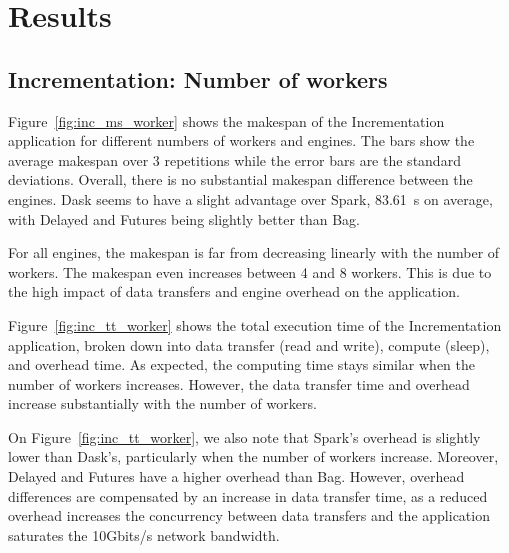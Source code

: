 \documentclass[conference]{IEEEtran}
\begin{document}
\section{Results}

\subsection{Incrementation: Number of workers}
Figure~\ref{fig:inc_ms_worker} shows the makespan of the Incrementation application
for different numbers of workers and engines. The bars show the average
makespan over 3 repetitions while the error bars are the standard deviations. Overall,
there is no substantial makespan difference between the engines. Dask seems to have a
slight advantage over Spark, \SI{83.61}{\second} on average,
with Delayed and Futures being slightly better than Bag.

For all engines, the makespan is far from decreasing linearly with the
number of workers. The makespan
even increases between 4 and 8 workers. This is due to the high impact of
data transfers and engine overhead on the application. 

Figure~\ref{fig:inc_tt_worker} shows the total execution time of the
Incrementation application, broken down into data transfer (read and
write), compute (sleep), and overhead time. As expected, the computing time
stays similar when the number of workers increases. However, the data
transfer time and overhead increase substantially with the number of
workers.





On Figure~\ref{fig:inc_tt_worker}, we also note that Spark's overhead is
slightly lower than Dask's, particularly when the number of workers
increase. Moreover, Delayed and Futures have a higher overhead than Bag.
However, overhead differences are compensated by an increase in data
transfer time, as a reduced overhead increases the concurrency between data
transfers and the application saturates the 10Gbits/s network bandwidth. 
\end{document}
